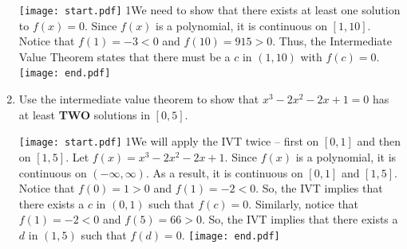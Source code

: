 \documentclass[12pt]{article}
\begin{document}
\begin{enumerate}
\texttt{[image: start.pdf]}
{{{1\linewidth}{We need to show that there exists at least one solution to $f(x)=0$.  Since $f(x)$ is a polynomial, it is continuous on $[1,10]$.  Notice that $f(1)=-3<0$ and $f(10)=915>0$.  Thus, the Intermediate Value Theorem states that there must be a $c$ in $(1,10)$ with $f(c)=0$.}}}
\texttt{[image: end.pdf]}


\item Use the intermediate value theorem to show that $x^3-2x^2-2x+1=0$ has at least {\bf TWO} solutions in $[0,5]$.

\texttt{[image: start.pdf]}
{{{1\linewidth}{We will apply the IVT twice -- first on $[0,1]$ and then on $[1,5]$.  Let $f(x)=x^3-2x^2-2x+1$.  Since $f(x)$ is a polynomial, it is continuous on $(-\infty,\infty)$.  As a result, it is continuous on $[0,1]$ and $[1,5]$.  Notice that $f(0)=1>0$ and $f(1)=-2<0$.  So, the IVT implies that there exists a $c$ in $(0,1)$ such that $f(c)=0$.  Similarly, notice that $f(1)=-2<0$ and $f(5)=66>0$.  So, the IVT implies that there exists a $d$ in $(1,5)$ such that $f(d)=0$.}}}
\texttt{[image: end.pdf]}


\end{enumerate}
\end{document}
